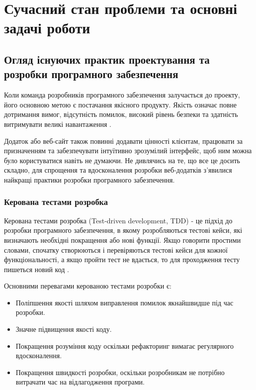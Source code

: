 \section{Сучасний стан проблеми та основні задачі роботи}

\subsection{Огляд існуючих практик проектування та розробки програмного забезпечення}

Коли команда розробників програмного забезпечення залучається до проекту,
його основною метою є постачання якісного продукту.
Якість означає повне дотримання вимог, відсутність помилок, високий рівень безпеки 
та здатність витримувати великі навантаження \cite{tdd-bdd-article}.

Додаток або веб-сайт також повинні додавати цінності клієнтам,
працювати за призначенням та забезпечувати інтуїтивно зрозумілий інтерфейс,
щоб ним можна було користуватися навіть не думаючи. Не дивлячись на те,
що все це досить складно, для спрощення та вдосконалення розробки веб-додатків з’явилися
найкращі практики розробки програмного забезпечення.

\subsubsection{Керована тестами розробка}

Керована тестами розробка (Test-driven development, TDD) 
- це підхід до розробки програмного забезпечення,
в якому розробляються тестові кейси, які визначають необхідні покращення або нові функції.
Якщо говорити простими словами, спочатку створюються і перевіряються тестові кейси
для кожної функціональності, а якщо пройти тест не вдається,
то для проходження тесту пишеться новий код \cite{tdd-article}.

Основними перевагами керованою тестами розробки є:

\begin{itemize}
		\item Поліпшення якості шляхом виправлення помилок якнайшвидше під час розробки.
		\item Значне підвищення якості коду.
		\item Покращення розуміння коду оскільки рефакторинг
			вимагає регулярного вдосконалення.
		\item Покращення швидкості розробки, оскільки розробникам
			не потрібно витрачати час на відлагодження програми.
\end{itemize}

